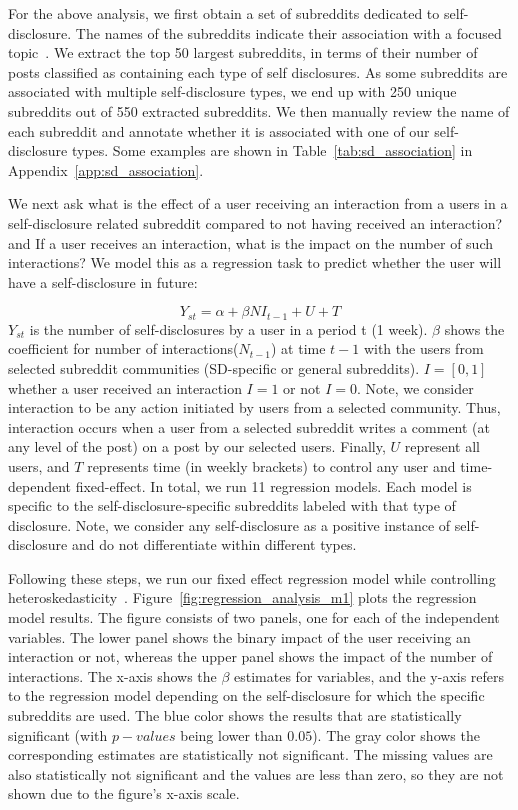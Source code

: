 For the above analysis, we first obtain a set of subreddits dedicated to self-disclosure. The names of the subreddits indicate their association with a focused topic~\cite{adelani_estimating_2020}. We extract the top 50 largest subreddits, in terms of their number of posts classified as containing each type of self disclosures. As some subreddits are associated with multiple self-disclosure types, we end up with 250 unique subreddits out of 550 extracted subreddits. 
We then manually review the name of each subreddit and annotate whether it is associated with one of our self-disclosure types.
Some examples are shown in Table~\ref{tab:sd_association} in Appendix~\ref{app:sd_association}. 



 We next ask \one what is the effect of a user receiving an interaction from a users in a self-disclosure related subreddit compared to not having received an interaction? 
and \two If a user receives an interaction, what is the impact on the number of such interactions? We model this as a regression task to predict whether the user will have a self-disclosure in future: 

\[ Y_{st} = \alpha + \beta NI_{t-1} + U + T \]
%
$Y_{st}$ is the number of self-disclosures by a user in a period t (1 week). $\beta$ shows the coefficient for number of interactions($N_{t-1}$) at time $t-1$ with the users from selected subreddit communities (SD-specific or general subreddits). $I = [0,1]$ whether a user received an interaction $I = 1$ or not $I = 0$. 
Note, we consider interaction to be any action initiated by users from a selected community. Thus, interaction occurs when a user from a selected subreddit writes a comment (at any level of the post) on a post by our selected users.
Finally, $U$ represent all users, and $T$ represents time (in weekly brackets) to control any user and time-dependent fixed-effect. In total, we run 11 regression models. Each model is specific to the self-disclosure-specific subreddits labeled with that type of disclosure. Note, we consider any self-disclosure as a positive instance of self-disclosure and do not differentiate within different types. 




 Following these steps, we run our fixed effect regression model while controlling heteroskedasticity~\cite{gujarati_basic_2009}. Figure~\ref{fig:regression_analysis_m1} plots the regression model results. The figure consists of two panels, one for each of the independent variables.
The lower panel shows the binary impact of the user receiving an interaction or not, whereas the upper panel shows the impact of the number of interactions. The x-axis shows the $\beta$ estimates for variables, and the y-axis refers to the regression model depending on the self-disclosure for which the specific subreddits are used. The blue color shows the results that are statistically significant (with $p-values$ being lower than $0.05$). The gray color shows the corresponding estimates are statistically not significant. The missing values are also statistically not significant and the values are less than zero, so they are not shown due to the figure's x-axis scale.  


